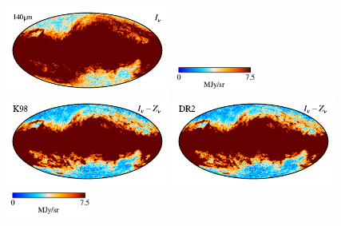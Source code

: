 \documentclass[twocolumn]{aa}
\begin{document}
\begin{figure}
    \includegraphics[height=2.90cm]{figs/compare_freq_maps/cosmoglobe_ma_09.pdf}%
    \includegraphics[width=2.90cm,angle=90]{figs/compare_freq_maps/cbar_tot_09.pdf}%
    \includegraphics[height=2.90cm]{figs/compare_freq_maps/dirbe_zsma_09.pdf}%
    \includegraphics[height=2.90cm]{figs/compare_freq_maps/cosmoglobe_zsma_09.pdf}%
    \includegraphics[width=2.90cm,angle=90]{figs/compare_freq_maps/cbar_09.pdf}%
      \\


\end{figure}
\end{document}
